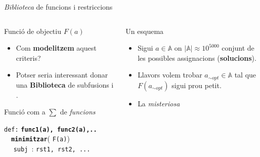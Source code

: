 \documentclass[twocolumn]{beamer}
\begin{document}
\begin{frame}{\textit{Biblioteca} de funcions i restriccions}
\begin{columns}[t]
	\begin{column}{.5\textwidth}
		\begin{block}{Funció de objectiu $F(a)$}
		\begin{itemize}
		 \item Com \textbf{modelitzem} aquest criteris?
		 \item Potser seria interessant donar una \textbf{Biblioteca} de subfusions i .
		\end{itemize}
		\end{block}
		
		\begin{block}{Funció com a $\sum$ de \textit{funcions}}
			
			\texttt{\color{green!75!black!75}def:} \texttt{\textbf{func1({\color{blue!75!black!75}a}), func2({\color{blue!75!black!75}a}),.. }}
			\\
			$\quad$\texttt{\color{purple!75!black!75}\textbf{minimitzar}}( \texttt{F({\color{blue!75!black!75}a})})
			\\ 	
			$\quad$ \texttt{\color{red!75!black!75}subj }: \texttt{rst1, rst2, ...}
			\\
		\end{block}
	\end{column}
	\begin{column}{.5\textwidth}
		\begin{block}{Un esquema}
		\begin{itemize}
		 \item Sigui $a \in \mathbb{A}$ on $|\mathbb{A}|\approx10^{5000}$ conjunt de les possibles assignacions (\textbf{solucions}).
		 \item Llavors volem trobar $a_{\sim opt} \in \mathbb{A}$
		 tal que $F(a_{\sim opt})$ sigui prou petit.
		 \item La \textit{misteriosa}
		  \end{itemize}
		\end{block}
	\end{column}
\end{columns}
\end{frame}
\end{document}

